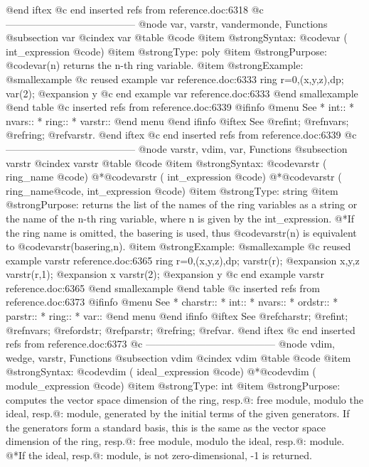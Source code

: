 {{{{{{{@end iftex
@c end inserted refs from reference.doc:6318
@c ---------------------------------------
@node var, varstr, vandermonde, Functions
@subsection var
@cindex var
@table @code
@item @strong{Syntax:}
@code{var (} int_expression @code{)}
@item @strong{Type:}
poly
@item @strong{Purpose:}
@code{var(n)} returns the n-th ring variable.
@item @strong{Example:}
@smallexample
@c reused example var reference.doc:6333 
  ring r=0,(x,y,z),dp;
  var(2);
@expansion{} y
@c end example var reference.doc:6333
@end smallexample
@end table
@c inserted refs from reference.doc:6339
@ifinfo
@menu
See
* int::
* nvars::
* ring::
* varstr::
@end menu
@end ifinfo
@iftex
See
@ref{int};
@ref{nvars};
@ref{ring};
@ref{varstr}.
@end iftex
@c end inserted refs from reference.doc:6339
@c ---------------------------------------
@node varstr, vdim, var, Functions
@subsection varstr
@cindex varstr
@table @code
@item @strong{Syntax:}
@code{varstr (} ring_name @code{)}
@*@code{varstr (} int_expression @code{)}
@*@code{varstr (} ring_name@code{,} int_expression @code{)}
@item @strong{Type:}
string
@item @strong{Purpose:}
returns the list of the names of the ring variables as a string
or the name of the n-th ring variable, where n is given by the
int_expression.
@*If the ring name is omitted, the basering is used, thus
@code{varstr(n)} is equivalent to @code{varstr(basering,n)}.
@item @strong{Example:}
@smallexample
@c reused example varstr reference.doc:6365 
  ring r=0,(x,y,z),dp;
  varstr(r);
@expansion{} x,y,z
  varstr(r,1);
@expansion{} x
  varstr(2);
@expansion{} y
@c end example varstr reference.doc:6365
@end smallexample
@end table
@c inserted refs from reference.doc:6373
@ifinfo
@menu
See
* charstr::
* int::
* nvars::
* ordstr::
* parstr::
* ring::
* var::
@end menu
@end ifinfo
@iftex
See
@ref{charstr};
@ref{int};
@ref{nvars};
@ref{ordstr};
@ref{parstr};
@ref{ring};
@ref{var}.
@end iftex
@c end inserted refs from reference.doc:6373
@c ---------------------------------------
@node vdim, wedge, varstr, Functions
@subsection vdim
@cindex vdim
@table @code
@item @strong{Syntax:}
@code{vdim (} ideal_expression @code{)}
@*@code{vdim (} module_expression @code{)}
@item @strong{Type:}
int
@item @strong{Purpose:}
computes the vector space dimension of the ring, resp.@: free module,
modulo the ideal, resp.@: module,
generated by the initial terms of the given generators.
If the generators form a standard basis,
this is the same as the vector space dimension of the ring, resp.@:
free module, modulo the ideal, resp.@: module.
@*If the ideal, resp.@: module, is not zero-dimensional, -1 is returned.
}}}}}}}
